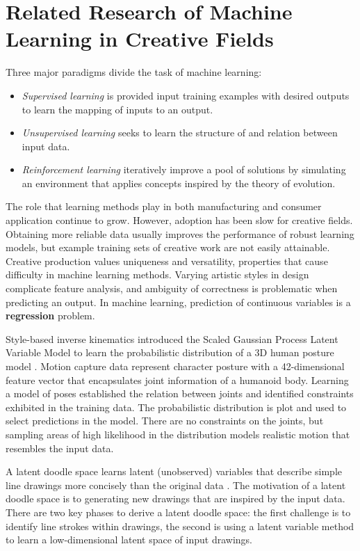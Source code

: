 \documentclass[ %
author={Dillon Keith Diep},
supervisor={Dr. Carl Henrik Ek},
degree={MEng},
title={ART-CG Hair:},
subtitle={Assisted Real-time Content Generation of Stylised Virtual Hair},
type={Research},
year={2017} ]{dissertation}
\begin{document}
	\section{Related Research of Machine Learning in Creative Fields}
	Three major paradigms divide the task of machine learning:
	\begin{itemize}
		\item \textit{Supervised learning} is provided input training examples with desired outputs to learn the mapping of inputs to an output.
		\item \textit{Unsupervised learning} seeks to learn the structure of and relation between input data.
		\item \textit{Reinforcement learning} iteratively improve a pool of solutions by simulating an environment that applies concepts inspired by the theory of evolution.
	\end{itemize}
	The role that learning methods play in both manufacturing and consumer application continue to grow. However, adoption has been slow for creative fields.  Obtaining more reliable data usually improves the performance of robust learning models, but example training sets of creative work are not easily attainable. Creative production values uniqueness and versatility, properties that cause difficulty in machine learning methods. Varying artistic styles in design complicate feature analysis, and ambiguity of correctness is problematic when predicting an output. In machine learning, prediction of continuous variables is a \textbf{regression} problem. 
	
	Style-based inverse kinematics introduced the Scaled Gaussian Process Latent Variable Model to learn the probabilistic distribution of a 3D human posture model \cite{styleik}.  Motion capture data represent character posture with a 42-dimensional feature vector that encapsulates joint information of a humanoid body. Learning a model of poses established the relation between joints and identified constraints exhibited in the training data.  The probabilistic distribution is plot and used to select predictions in the model. There are no constraints on the joints, but sampling areas of high likelihood in the distribution models realistic motion that resembles the input data.
	
	A latent doodle space learns latent (unobserved) variables that describe simple line drawings more concisely than the original data \cite{latentdoodle}. The motivation of a latent doodle space is to generating new drawings that are inspired by the input data. There are two key phases to derive a latent doodle space: the first challenge is to identify line strokes within drawings, the second is using a latent variable method to learn a low-dimensional latent space of input drawings.
	
\end{document}
